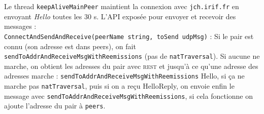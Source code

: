 Le thread \texttt{keepAliveMainPeer} maintient la connexion avec \texttt{jch.irif.fr} en envoyant \textit{Hello} toutes les 30 s.
L'API exposée pour envoyer et recevoir des messages : \\
\texttt{ConnectAndSendAndReceive(peerName string, toSend udpMsg)} :
Si le pair est connu (son adresse est dans peers), on fait \texttt{sendToAddrAndReceiveMsgWithReemissions} (pas de \texttt{natTraversal}). Si aucune ne marche, on obtient les adresses du pair avec \textsc{rest} et jusqu'à ce qu'une adresse des adresses marche : \texttt{sendToAddrAndReceiveMsgWithReemissions} Hello, si ça ne marche pas \texttt{natTraversal}, puis si on a reçu HelloReply, on envoie enfin le message avec \texttt{sendToAddrAndReceiveMsgWithReemissions}, si cela fonctionne on ajoute l'adresse du pair à \texttt{peers}.
